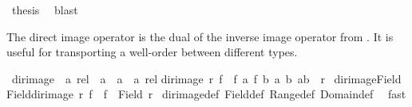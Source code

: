 \begin{isabellebody}
\ {\isacharquery}{\kern0pt}thesis\ \isamarkupfalse%
\ blast\isanewline
{}\isamarkupfalse%
%
\endisatagproof
{\isafoldproof}%
%
\isadelimproof
%
\endisadelimproof
%
\isadelimdocument
%
\endisadelimdocument
%
\isatagdocument
%
\isamarkuptrue%
%
\endisatagdocument
{\isafolddocument}%
%
\isadelimdocument
%
\endisadelimdocument
%
\begin{isamarkuptext}%
The direct image operator is the dual of the inverse image operator 
from .  It is useful for transporting a well-order between
different types.%
\end{isamarkuptext}\isamarkuptrue%
\isamarkupfalse%
\ dir{\isacharunderscore}{\kern0pt}image\ {\isacharcolon}{\kern0pt}{\isacharcolon}{\kern0pt}\ {\isachardoublequoteopen}{\isacharprime}{\kern0pt}a\ rel\ {\isasymRightarrow}\ {\isacharparenleft}{\kern0pt}{\isacharprime}{\kern0pt}a\ {\isasymRightarrow}\ {\isacharprime}{\kern0pt}a{\isacharprime}{\kern0pt}{\isacharparenright}{\kern0pt}\ {\isasymRightarrow}\ {\isacharprime}{\kern0pt}a{\isacharprime}{\kern0pt}\ rel{\isachardoublequoteclose}\isanewline
{}\isanewline
{\isachardoublequoteopen}dir{\isacharunderscore}{\kern0pt}image\ r\ f\ {\isacharequal}{\kern0pt}\ {\isacharbraceleft}{\kern0pt}{\isacharparenleft}{\kern0pt}f\ a{\isacharcomma}{\kern0pt}\ f\ b{\isacharparenright}{\kern0pt}{\isacharbar}{\kern0pt}\ a\ b{\isachardot}{\kern0pt}\ {\isacharparenleft}{\kern0pt}a{\isacharcomma}{\kern0pt}b{\isacharparenright}{\kern0pt}\ {\isasymin}\ r{\isacharbraceright}{\kern0pt}{\isachardoublequoteclose}\isanewline
\isanewline
{}\isamarkupfalse%
\ dir{\isacharunderscore}{\kern0pt}image{\isacharunderscore}{\kern0pt}Field{\isacharcolon}{\kern0pt}\isanewline
{\isachardoublequoteopen}Field{\isacharparenleft}{\kern0pt}dir{\isacharunderscore}{\kern0pt}image\ r\ f{\isacharparenright}{\kern0pt}\ {\isacharequal}{\kern0pt}\ f\ {\isacharbackquote}{\kern0pt}\ {\isacharparenleft}{\kern0pt}Field\ r{\isacharparenright}{\kern0pt}{\isachardoublequoteclose}\isanewline
%
\isadelimproof
%
\endisadelimproof
%
\isatagproof
{}\isamarkupfalse%
\ dir{\isacharunderscore}{\kern0pt}image{\isacharunderscore}{\kern0pt}def\ Field{\isacharunderscore}{\kern0pt}def\ Range{\isacharunderscore}{\kern0pt}def\ Domain{\isacharunderscore}{\kern0pt}def\ \isamarkupfalse%
\ fast%
\endisatagproof
{\isafoldproof}%
%
\isadelimproof
\isanewline
%
\endisadelimproof

\end{isabellebody}
